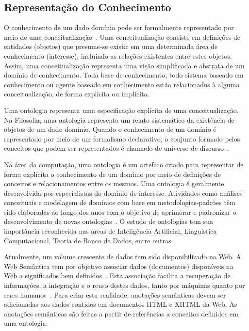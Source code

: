 \subsection{Representação do Conhecimento}\label{2-fundamentacao-sws-representacao-conhecimento}

O conhecimento de um dado domínio pode ser formalmente representado por meio de uma conceitualização~\cite{GRUBER-1993-Ontologies, GRUBER-1995-Ontologies}. Uma conceitualização consiste em definições de entidades (objetos) que presume-se existir em uma determinada área de conhecimento (interesse), incluindo as relações existentes entre estes objetos. Assim, uma conceitualização representa uma visão simplificada e abstrata de um domínio de conhecimento. Toda base de conhecimento, todo sistema baseado em conhecimento ou agente baseado em conhecimento estão relacionados à alguma conceitualização, de forma explícita ou implícita.

Uma ontologia representa uma especificação explícita de uma conceitualização. Na Filosofia, uma ontologia representa um relato sistemático da existência de objetos de um dado domínio. Quando o conhecimento de um domínio é representado por meio de um formalismo declarativo, o conjunto formado pelos conceitos que podem ser representados é chamado de universo de discurso~\cite{GRUBER-1993-Ontologies}.


Na área da computação, uma ontologia é um artefato criado para representar de forma explícita o conhecimento de um domínio por meio de definições de conceitos e relacionamentos entre os mesmos. Uma ontologia é geralmente desenvolvida por especialistas do domínio de interesse. Atividades como análises conceituais e modelagem de domínios com base em metodologias-padrões têm sido elaboradas ao longo dos anos com o objetivo de aprimorar e padronizar o desenvolvimento de novas ontologias~\cite{GUARINO-1998-Ontology}. O estudo de ontologias tem sua importância reconhecida nas áreas de Inteligência Artificial, Linguística Computacional, Teoria de Banco de Dados, entre outras.

Atualmente, um volume crescente de dados tem sido disponibilizado na Web. A Web Semântica tem por objetivo associar dados (documentos) disponíveis na Web a significados bem definidos~\cite{BERNERS-HENDLER-LASSILA-2001-Semantic-Web}. Esta associação facilita a recuperação de informações, a integração e o reuso destes dados, tanto por máquinas quanto por seres humanos~\cite{CARDOSO-2006-Semantic-Web-Services}. Para criar esta realidade, anotações semânticas devem ser adicionadas aos dados contidos em documentos HTML e XHTML da Web. As anotações semânticas são feitas a partir de referências a conceitos definidos em uma ontologia. 


